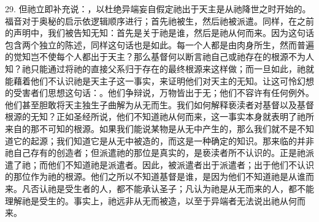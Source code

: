 29. 但祂立即补充说：，以杜绝异端妄自假定祂出于天主是从祂降世之时开始的。福音对于奥秘的启示依逻辑顺序进行；首先祂被生，然后祂被派遣。同样，在之前的声明中，我们被告知无知：首先是关于祂是谁，然后是祂从何而来。因为这句话包含两个独立的陈述，同样这句话也是如此。每一个人都是由肉身所生，然而普遍的觉知岂不使每个人都出于天主？那么基督何以断言祂自己或祂存在的根源不为人知？祂只能通过将祂的直接父系归于存在的最终根源来这样做；而一旦如此，祂就能藉着他们不认识祂是天主子这一事实，来证明他们对天主的无知。让这可怜幻想的受害者们思想这句话：。他们争辩说，万物皆出于无；他们不容许有任何例外。他们甚至胆敢将天主独生子曲解为从无而生。我们如何解释亵渎者对基督以及基督根源的无知？正如圣经所说，他们不知道祂从何而来，这一事实本身就表明了祂所来自的那不可知的根源。如果我们能说某物是从无中产生的，那么我们就不是不知道它的起源；我们知道它是从无中被造的，而这是一种确定的知识。那来临的并非祂自己存有的创造者；但派遣祂的那位是真实的，是亵渎者所不认识的。正是祂派遣了祂；而他们不知道祂是派遣者。因此，被派遣者出于派遣者；出于他们不认识的那位作为祂的根源。他们之所以不知道基督是谁，是因为他们不知道祂是从谁而来。凡否认祂是受生者的人，都不能承认圣子；凡认为祂是从无而来的人，都不能理解祂是受生的。事实上，祂远非从无而被造，以至于异端者无法说出祂从何而来。\par

